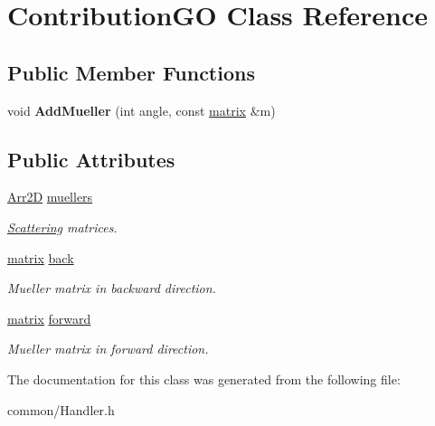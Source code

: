 \hypertarget{class_contribution_g_o}{}\section{Contribution\+GO Class Reference}
\label{class_contribution_g_o}
\subsection*{Public Member Functions}
\begin{DoxyCompactItemize}
\item 
\mbox{\label{class_contribution_g_o_aed705673c76a0b5db8f465056e0f3de5}} 
void {\bfseries Add\+Mueller} (int angle, const \mbox{\hyperlink{classmatrix}{matrix}} \&m)
\end{DoxyCompactItemize}
\subsection*{Public Attributes}
\begin{DoxyCompactItemize}
\item 
\mbox{\label{class_contribution_g_o_a5d24a87ebb01226a4796c4372a87bda7}} 
\mbox{\hyperlink{class_arr2_d}{Arr2D}} \mbox{\hyperlink{class_contribution_g_o_a5d24a87ebb01226a4796c4372a87bda7}{muellers}}
\begin{DoxyCompactList}\small\item\em \mbox{\hyperlink{class_scattering}{Scattering}} matrices. \end{DoxyCompactList}\item 
\mbox{\label{class_contribution_g_o_ac0f142d78242514788c7b811cd91675e}} 
\mbox{\hyperlink{classmatrix}{matrix}} \mbox{\hyperlink{class_contribution_g_o_ac0f142d78242514788c7b811cd91675e}{back}}
\begin{DoxyCompactList}\small\item\em Mueller matrix in backward direction. \end{DoxyCompactList}\item 
\mbox{\label{class_contribution_g_o_a9beff7b30c3e6f3cb7ea6e0bf1c4957b}} 
\mbox{\hyperlink{classmatrix}{matrix}} \mbox{\hyperlink{class_contribution_g_o_a9beff7b30c3e6f3cb7ea6e0bf1c4957b}{forward}}
\begin{DoxyCompactList}\small\item\em Mueller matrix in forward direction. \end{DoxyCompactList}\end{DoxyCompactItemize}


The documentation for this class was generated from the following file\+:\begin{DoxyCompactItemize}
\item 
common/Handler.\+h\end{DoxyCompactItemize}
